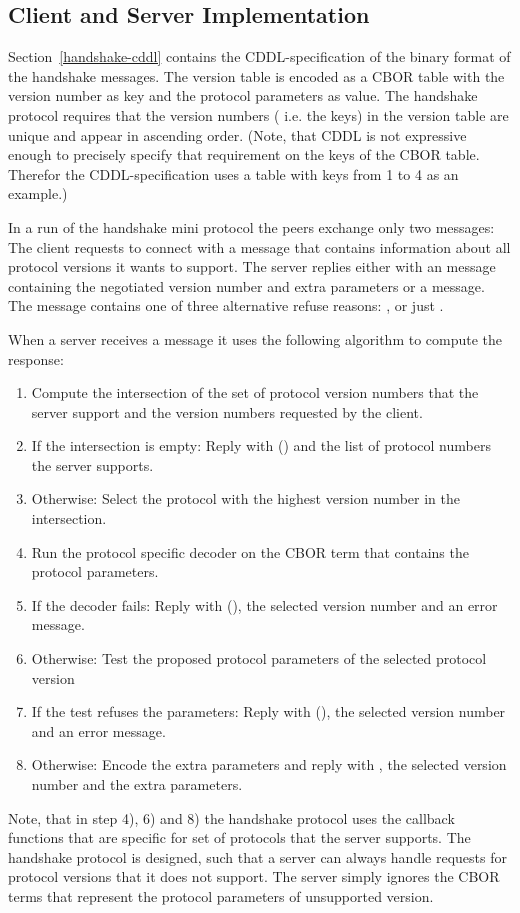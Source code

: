\subsection{Client and Server Implementation}
Section~\ref{handshake-cddl} contains the CDDL-specification of the binary format of the handshake messages.
The version table is encoded as a CBOR table with the version number as key
and the protocol parameters as value.
The handshake protocol requires that the version numbers ( i.e. the keys) in the version table are unique
and appear in ascending order.
(Note, that CDDL is not expressive enough to precisely specify that requirement on the keys of the CBOR
table. Therefor the CDDL-specification uses a table with keys from 1 to 4 as an example.)

In a run of the handshake mini protocol the peers exchange only two messages:
The client requests to connect with a \MsgProposeVersions{} message that contains information about
all protocol versions it wants to support.
The server replies either with an \MsgAcceptVersion{} message containing the negotiated
version number and extra parameters or a \MsgRefuse{} message.
The \MsgRefuse{} message contains one of three alternative refuse reasons:
\VersionMismatch{}, \HandshakeDecodeError{} or just \Refused{}.

When a server receives a \MsgProposeVersions{} message it uses the following algorithm to
compute the response:
\begin{enumerate}
\item
  Compute the intersection of the set of protocol version numbers that the server support
  and the version numbers requested by the client.
\item
  If the intersection is empty:
  Reply with \MsgRefuse(\VersionMismatch) and the list of protocol numbers the server supports.
\item
  Otherwise:
  Select the protocol with the highest version number in the intersection.
\item
  Run the protocol specific decoder on the CBOR term that contains the protocol parameters.
\item
  If the decoder fails:
  Reply with \MsgRefuse(\HandshakeDecodeError), the selected version number and an error message.
\item
  Otherwise: Test the proposed protocol parameters of the selected protocol version
\item
  If the test refuses the parameters:
    Reply with \MsgRefuse(\Refused), the selected version number and an error message.
\item
  Otherwise:
  Encode the extra parameters and
  reply with \MsgAcceptVersion, the selected version number and the extra parameters.
\end{enumerate}
Note, that in step 4), 6) and 8) the handshake protocol uses the callback functions that are specific
for set of protocols that the server supports.
The handshake protocol is designed,
such that a server can always handle requests for protocol versions that it does not support.
The server simply ignores the CBOR terms that represent the protocol parameters of unsupported
version.

